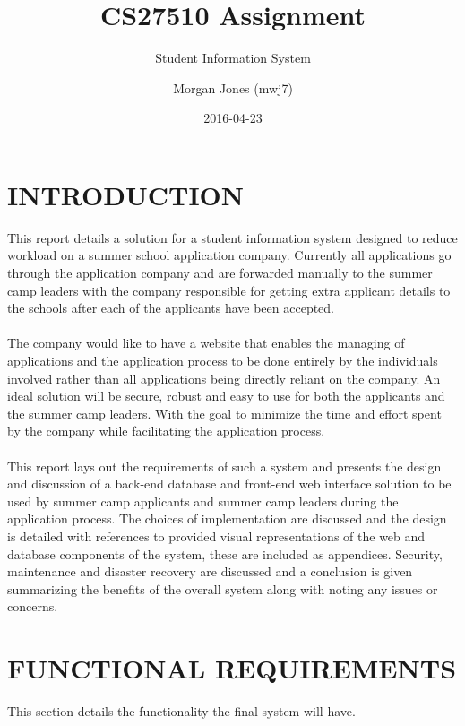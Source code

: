 \documentclass{project}
\begin{document}
\title{CS27510 Assignment}
\subtitle{Student Information System}
\author{Morgan Jones (mwj7)}     
\date{2016-04-23}
\maketitle
\tableofcontents
\newpage
\section{INTRODUCTION}
This report details a solution for a student information system designed to reduce workload on a summer school application company.  Currently all applications go through the application company and are forwarded manually to the summer camp leaders with the company responsible for getting extra applicant details to the schools after each of the applicants have been accepted.
\\\\
The company would like to have a website that enables the managing of applications and the application process to be done entirely by the individuals involved rather than all applications being directly reliant on the company. An ideal solution will be secure, robust and easy to use for both the applicants and the summer camp leaders. With the goal to minimize the time and effort spent by the company while facilitating the application process.
\\\\
This report lays out the requirements of such a system and presents the design and discussion of a back-end database and front-end web interface solution to be used by summer camp applicants and summer camp leaders during the application process. The choices of implementation are discussed and the design is detailed with references to provided visual representations of the web and database components of the system, these are included as appendices. Security, maintenance and disaster recovery are discussed and a conclusion is given summarizing the benefits of the overall system along with noting any issues or concerns.
\newpage
\section{FUNCTIONAL REQUIREMENTS}
This section details the functionality the final system will have.
\end{document}
